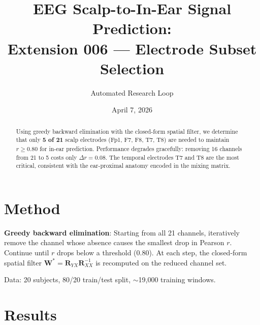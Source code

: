 \documentclass[11pt,a4paper]{article}
\title{EEG Scalp-to-In-Ear Signal Prediction:\\
  Extension 006 --- Electrode Subset Selection}
\author{Automated Research Loop}
\date{April 7, 2026}
\begin{document}
\maketitle

\begin{abstract}
Using greedy backward elimination with the closed-form spatial filter,
we determine that only \textbf{5 of 21} scalp electrodes (Fp1, F7, F8, T7, T8)
are needed to maintain $r \geq 0.80$ for in-ear prediction. Performance
degrades gracefully: removing 16 channels from 21 to 5 costs only $\Delta r = 0.08$.
The temporal electrodes T7 and T8 are the most critical, consistent with
the ear-proximal anatomy encoded in the mixing matrix.
\end{abstract}

\section{Method}

\textbf{Greedy backward elimination}: Starting from all 21 channels, iteratively
remove the channel whose absence causes the smallest drop in Pearson $r$.
Continue until $r$ drops below a threshold (0.80). At each step, the closed-form
spatial filter $\mathbf{W}^* = \mathbf{R}_{YX}\mathbf{R}_{XX}^{-1}$ is recomputed
on the reduced channel set.

Data: 20 subjects, 80/20 train/test split, $\sim$19,000 training windows.

\section{Results}
\end{document}
